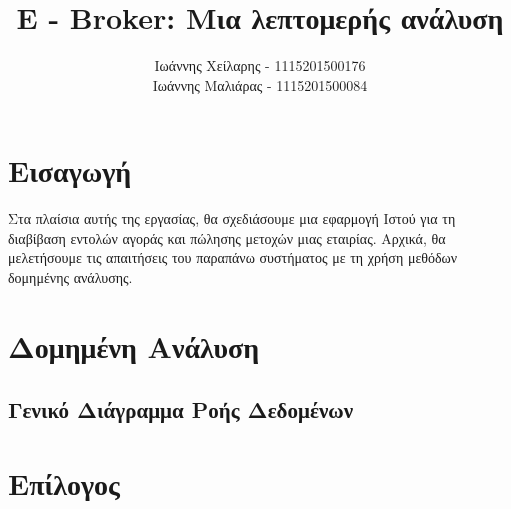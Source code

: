 \documentclass{article}
\begin{document}
\title{E - Broker: Μια λεπτομερής ανάλυση}
\author{
	Ιωάννης Χείλαρης - 1115201500176
	\\
	Ιωάννης Μαλιάρας - 1115201500084
}

\maketitle

\newpage
\tableofcontents


\newpage
\section{Εισαγωγή}
	Στα πλαίσια αυτής της εργασίας, θα σχεδιάσουμε μια εφαρμογή Ιστού για τη διαβίβαση εντολών αγοράς και πώλησης μετοχών μιας εταιρίας.
	Αρχικά, θα μελετήσουμε τις απαιτήσεις του παραπάνω συστήματος με τη χρήση μεθόδων δομημένης ανάλυσης.

	
\newpage
\section{Δομημένη Ανάλυση}
	\subsection{Γενικό Διάγραμμα Ροής Δεδομένων}
	
	\subsection{}

\newpage
\section{Επίλογος}
\end{document}
